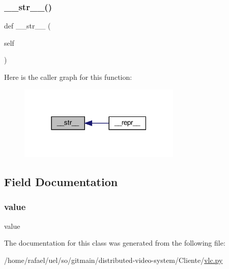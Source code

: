 \subsubsection{\texorpdfstring{\+\_\+\+\_\+str\+\_\+\+\_\+()}{\_\_str\_\_()}}
{\footnotesize\ttfamily def \+\_\+\+\_\+str\+\_\+\+\_\+ (\begin{DoxyParamCaption}\item[{}]{self }\end{DoxyParamCaption})}

Here is the caller graph for this function\+:
\nopagebreak
\begin{figure}[H]
\begin{center}
\leavevmode
\includegraphics[width=219pt]{classvlc_1_1___enum_a23e8041ce1015febe4fdace3225714f9_icgraph}
\end{center}
\end{figure}


\subsection{Field Documentation}
\mbox{\label{classvlc_1_1___enum_afcc7a4b78ecd8fa7e713f8cfa0f51017}} 
\subsubsection{\texorpdfstring{value}{value}}
{\footnotesize\ttfamily value}



The documentation for this class was generated from the following file\+:\begin{DoxyCompactItemize}
\item 
/home/rafael/uel/so/gitmain/distributed-\/video-\/system/\+Cliente/\hyperlink{vlc_8py}{vlc.\+py}\end{DoxyCompactItemize}
